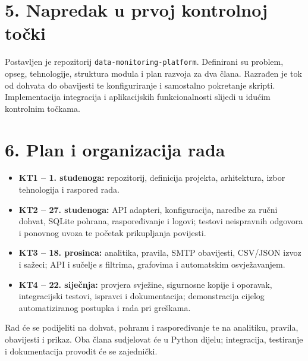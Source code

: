 \documentclass[a4paper,11pt]{article}
\begin{document}
\section*{5. Napredak u prvoj kontrolnoj točki}
Postavljen je repozitorij \texttt{data-monitoring-platform}. Definirani su
problem, opseg, tehnologije, struktura modula i plan razvoja za dva člana.
Razrađen je tok od dohvata do obavijesti te konfiguriranje i samostalno
pokretanje skripti. Implementacija integracija i aplikacijskih
funkcionalnosti slijedi u idućim kontrolnim točkama.

\section*{6. Plan i organizacija rada}
\begin{itemize}
\item \textbf{KT1 -- 1. studenoga:} repozitorij, definicija projekta,
arhitektura, izbor tehnologija i raspored rada.
\item \textbf{KT2 -- 27. studenoga:} API adapteri, konfiguracija, naredbe
za ručni dohvat, SQLite pohrana, raspoređivanje i logovi; testovi
neispravnih odgovora i ponovnog uvoza te početak prikupljanja povijesti.
\item \textbf{KT3 -- 18. prosinca:} analitika, pravila, SMTP obavijesti,
CSV/JSON izvoz i sažeci; API i sučelje s filtrima, grafovima i
automatskim osvježavanjem.
\item \textbf{KT4 -- 22. siječnja:} provjera svježine, sigurnosne kopije
i oporavak, integracijski testovi, ispravci i dokumentacija;
demonstracija cijelog automatiziranog postupka i rada pri greškama.
\end{itemize}

Rad će se podijeliti na dohvat, pohranu i raspoređivanje te na analitiku,
pravila, obavijesti i prikaz. Oba člana sudjelovat će u Python dijelu;
integracija, testiranje i dokumentacija provodit će se zajednički.
\end{document}
